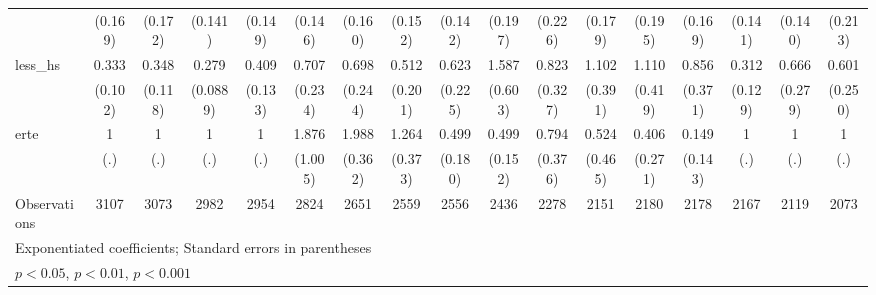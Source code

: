 {\begin{tabular}{l*{16}{c}}
                    &     (0.169)         &     (0.172)         &     (0.141)         &     (0.149)         &     (0.146)         &     (0.160)         &     (0.152)         &     (0.142)         &     (0.197)         &     (0.226)         &     (0.179)         &     (0.195)         &     (0.169)         &     (0.141)         &     (0.140)         &     (0.213)         \\
[1em]
less\_hs             &       0.333\sym{***}&       0.348\sym{**} &       0.279\sym{***}&       0.409\sym{**} &       0.707         &       0.698         &       0.512         &       0.623         &       1.587         &       0.823         &       1.102         &       1.110         &       0.856         &       0.312\sym{**} &       0.666         &       0.601         \\
                    &     (0.102)         &     (0.118)         &    (0.0889)         &     (0.133)         &     (0.234)         &     (0.244)         &     (0.201)         &     (0.225)         &     (0.603)         &     (0.327)         &     (0.391)         &     (0.419)         &     (0.371)         &     (0.129)         &     (0.279)         &     (0.250)         \\
[1em]
erte                &           1         &           1         &           1         &           1         &       1.876         &       1.988\sym{***}&       1.264         &       0.499         &       0.499\sym{*}  &       0.794         &       0.524         &       0.406         &       0.149\sym{*}  &           1         &           1         &           1         \\
                    &         (.)         &         (.)         &         (.)         &         (.)         &     (1.005)         &     (0.362)         &     (0.373)         &     (0.180)         &     (0.152)         &     (0.376)         &     (0.465)         &     (0.271)         &     (0.143)         &         (.)         &         (.)         &         (.)         \\
\hline
Observations        &        3107         &        3073         &        2982         &        2954         &        2824         &        2651         &        2559         &        2556         &        2436         &        2278         &        2151         &        2180         &        2178         &        2167         &        2119         &        2073         \\
\hline\hline
\multicolumn{17}{l}{\footnotesize Exponentiated coefficients; Standard errors in parentheses}\\
\multicolumn{17}{l}{\footnotesize \sym{*} \(p<0.05\), \sym{**} \(p<0.01\), \sym{***} \(p<0.001\)}\\
\end{tabular}
}
